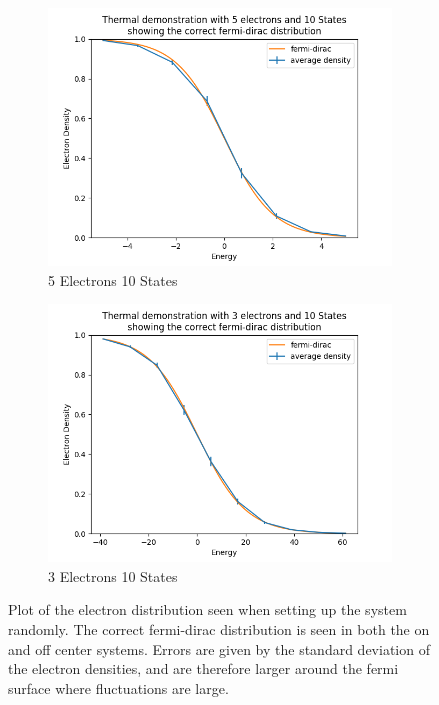 \begin{figure}[htbp]
    \centering
    \begin{subfigure}{0.45\linewidth}
        \centering
        \includegraphics[width =0.9 \linewidth]{Figures/Simulation/Plot of correct fermi dirac distribution on center.png}
        \caption{5 Electrons 10 States}
    \end{subfigure}
    \hfill
    \begin{subfigure}{0.45\linewidth}
        \centering
        \includegraphics[width = 0.9\linewidth]{Figures/Simulation/Plot of correct fermi dirac distribution off centre.png}
        \caption{3 Electrons 10 States}
    \end{subfigure}
    \caption{Plot of the electron distribution seen
        when setting up the system randomly. The
        correct fermi-dirac distribution is seen in both the on and
        off center systems. Errors are given by the standard
        deviation of the electron densities, and are therefore
        larger around the fermi surface where fluctuations are
        large.}\label{fig:correct fermi dirac}
\end{figure}
